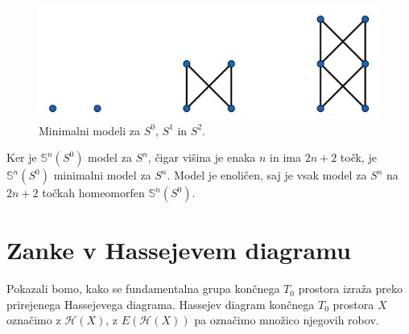 \documentclass[mat1]{fmfdelo}
\DeclareRobustCommand{\h}{
    \mathcal{H}
}
\begin{document}
\begin{figure}[h]
    \centering
    \includegraphics[width=0.8\linewidth]{sfere.png}
    \caption{Minimalni modeli za $S^0$, $S^1$ in $S^2$.}
\end{figure}

Ker je $\mathds{S}^n(S^0)$ model za $S^n$, čigar višina je enaka $n$ in ima 
$2n+2$ točk, je $\mathds{S}^n(S^0)$ minimalni model za $S^n$. Model je 
enoličen, saj je vsak model za $S^n$ na $2n+2$ točkah homeomorfen 
$\mathds{S}^n(S^0)$.
\section{Zanke v Hassejevem diagramu}\label{sec:hasse}

Pokazali bomo, kako se fundamentalna grupa končnega $T_0$ 
prostora izraža preko prirejenega Hassejevega diagrama.
Hassejev diagram končnega $T_0$ prostora $X$ označimo z 
$\h(X)$, z $E(\h(X))$ pa označimo množico njegovih robov.
\end{document}
